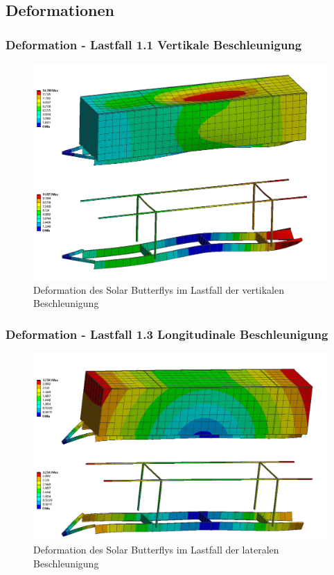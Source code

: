   \newpage

\subsection{Deformationen}
\label{FEM Deformation}
\subsubsection{Deformation - Lastfall 1.1 Vertikale Beschleunigung}
\begin{figure}[H]
  \centering
  \includegraphics[width=1\linewidth]{04_figures/FEM 1.1.png}
  \caption{Deformation des Solar Butterflys im Lastfall der vertikalen Beschleunigung}
  \label{FEM 1.1}
\end{figure}

\subsubsection{Deformation - Lastfall 1.3 Longitudinale Beschleunigung}
\begin{figure}[H]
  \centering
  \includegraphics[width=1\linewidth]{04_figures/FEM 1.2.png}
  \caption{Deformation des Solar Butterflys im Lastfall der lateralen Beschleunigung}
  \label{FEM 1.3}
\end{figure}

